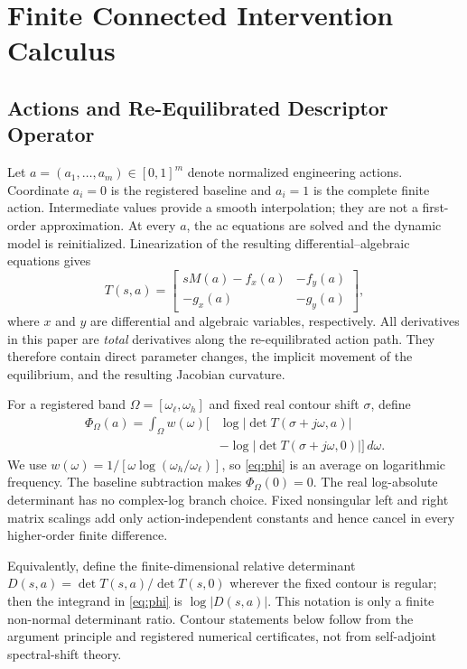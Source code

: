 \section{Finite Connected Intervention Calculus}
\subsection{Actions and Re-Equilibrated Descriptor Operator}

Let $a=(a_1,\ldots,a_m)\in[0,1]^m$ denote normalized engineering actions.
Coordinate $a_i=0$ is the registered baseline and $a_i=1$ is the complete
finite action. Intermediate values provide a smooth interpolation; they are
not a first-order approximation. At every $a$, the ac equations are solved and
the dynamic model is reinitialized. Linearization of the resulting
differential--algebraic equations gives
\begin{equation}
T(s,a)=
\begin{bmatrix}
sM(a)-f_x(a) & -f_y(a)\\
-g_x(a) & -g_y(a)
\end{bmatrix},
\label{eq:descriptor}
\end{equation}
where $x$ and $y$ are differential and algebraic variables, respectively.
All derivatives in this paper are \emph{total} derivatives along the
re-equilibrated action path. They therefore contain direct parameter changes,
the implicit movement of the equilibrium, and the resulting Jacobian
curvature.

For a registered band $\Omega=[\omega_\ell,\omega_h]$ and fixed real
contour shift $\sigma$, define
\begin{equation}
\begin{aligned}
\Phi_\Omega(a)=\int_\Omega w(\omega)\big[&
\log|\det T(\sigma+j\omega,a)|\\
&-\log|\det T(\sigma+j\omega,0)|\big]\,d\omega .
\end{aligned}
\label{eq:phi}
\end{equation}
We use $w(\omega)=1/[\omega\log(\omega_h/\omega_\ell)]$, so
\eqref{eq:phi} is an average on logarithmic frequency. The baseline
subtraction makes $\Phi_\Omega(0)=0$. The real log-absolute determinant has
no complex-log branch choice. Fixed nonsingular left and right matrix
scalings add only action-independent constants and hence cancel in every
higher-order finite difference.

Equivalently, define the finite-dimensional relative determinant
$D(s,a)=\det T(s,a)/\det T(s,0)$ wherever the fixed contour is regular; then
the integrand in \eqref{eq:phi} is $\log|D(s,a)|$. This notation is only a
finite non-normal determinant ratio. Contour statements below follow from the
argument principle and registered numerical certificates, not from
self-adjoint spectral-shift theory.

